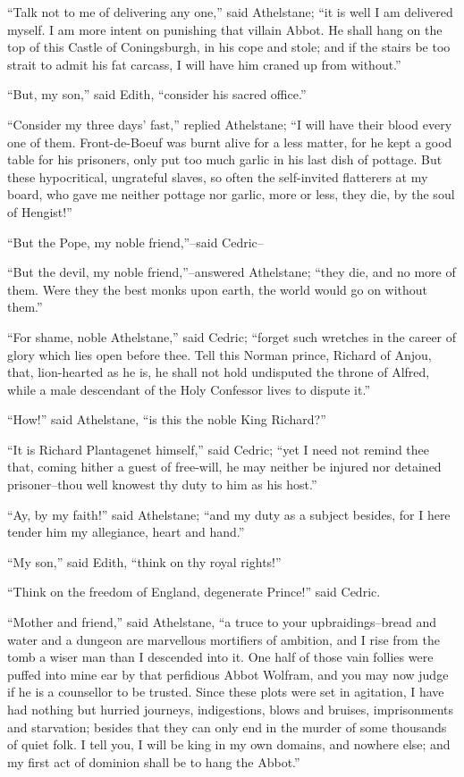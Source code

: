 ``Talk not to me of delivering any one,'' said Athelstane; ``it is well
I am delivered myself. I am more intent on punishing that villain Abbot.
He shall hang on the top of this Castle of Coningsburgh, in his cope and
stole; and if the stairs be too strait to admit his fat carcass, I will
have him craned up from without.''

``But, my son,'' said Edith, ``consider his sacred office.''

``Consider my three days' fast,'' replied Athelstane; ``I will have
their blood every one of them. Front-de-Boeuf was burnt alive for a less
matter, for he kept a good table for his prisoners, only put too much
garlic in his last dish of pottage. But these hypocritical, ungrateful
slaves, so often the self-invited flatterers at my board, who gave me
neither pottage nor garlic, more or less, they die, by the soul of
Hengist!''

``But the Pope, my noble friend,''--said Cedric--

``But the devil, my noble friend,''--answered Athelstane; ``they die,
and no more of them. Were they the best monks upon earth, the world
would go on without them.''

``For shame, noble Athelstane,'' said Cedric; ``forget such wretches in
the career of glory which lies open before thee. Tell this Norman
prince, Richard of Anjou, that, lion-hearted as he is, he shall not hold
undisputed the throne of Alfred, while a male descendant of the Holy
Confessor lives to dispute it.''

``How!'' said Athelstane, ``is this the noble King Richard?''

``It is Richard Plantagenet himself,'' said Cedric; ``yet I need not
remind thee that, coming hither a guest of free-will, he may neither be
injured nor detained prisoner--thou well knowest thy duty to him as his
host.''

``Ay, by my faith!'' said Athelstane; ``and my duty as a subject
besides, for I here tender him my allegiance, heart and hand.''

``My son,'' said Edith, ``think on thy royal rights!''

``Think on the freedom of England, degenerate Prince!'' said Cedric.

``Mother and friend,'' said Athelstane, ``a truce to your
upbraidings--bread and water and a dungeon are marvellous mortifiers of
ambition, and I rise from the tomb a wiser man than I descended into it.
One half of those vain follies were puffed into mine ear by that
perfidious Abbot Wolfram, and you may now judge if he is a counsellor to
be trusted. Since these plots were set in agitation, I have had nothing
but hurried journeys, indigestions, blows and bruises, imprisonments and
starvation; besides that they can only end in the murder of some
thousands of quiet folk. I tell you, I will be king in my own domains,
and nowhere else; and my first act of dominion shall be to hang the
Abbot.''

